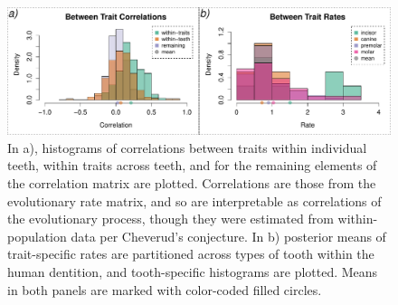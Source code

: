\begin{figure}[h]
\centering
\includegraphics[width=160mm]{figures/dental_rates_corrs.pdf}
\caption[Estimated Rates and Correlations of Discrete Dental Evolution]{In a), histograms of correlations between traits within individual teeth, within traits across teeth, and for the remaining elements of the correlation matrix are plotted. Correlations are those from the evolutionary rate matrix, and so are interpretable as correlations of the evolutionary process, though they were estimated from within-population data per Cheverud's conjecture. In b) posterior means of trait-specific rates are partitioned across types of tooth within the human dentition, and tooth-specific histograms are plotted. Means in both panels are marked with color-coded filled circles. \label{overflow}
\label{fig:dentalRatesCorrs}
}
\end{figure}


